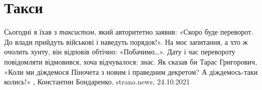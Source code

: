  
 
 
 
 

\chapter{Такси}

Сьогодні я їхав з \emph{таксистом}, який авторитетно заявив: «Скоро буде
переворот. До влади прийдуть військові і наведуть порядок!». На моє запитання,
а хто ж очолить хунту, він відповів обтічно: «Побачимо…». Дату і час перевороту
повідомляти відмовився, хоча відчувалося: знає.  Як сказав би Тарас Григорович,
«Коли ми діждемося Піночета з новим і праведним декретом? А діждемось-таки
колись!»
, 
Константин Бондаренко, strana.news, 24.10.2021
